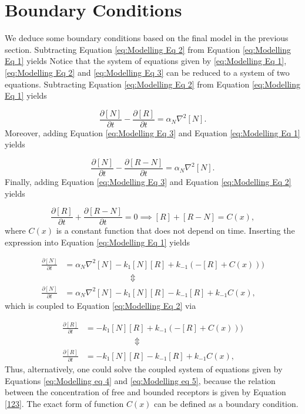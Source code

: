 \documentclass{article}
\begin{document}
\section{Boundary Conditions}
We deduce some boundary conditions based on the final model in the previous section. Subtracting Equation \eqref{eq:Modelling Eq 2} from Equation \eqref{eq:Modelling Eq 1} yields
Notice that the system of equations given by \eqref{eq:Modelling Eq 1}, \eqref{eq:Modelling Eq 2} and \eqref{eq:Modelling Eq 3} can be reduced to a system of two equations. Subtracting Equation \eqref{eq:Modelling Eq 2} from Equation \eqref{eq:Modelling Eq 1} yields

\begin{equation}\label{eqn:addition1}
    \frac{\partial [N]}{\partial t}-\frac{\partial [R]}{\partial t} = \alpha_N\nabla^2[N].
\end{equation}
Moreover, adding Equation \eqref{eq:Modelling Eq 3} and Equation \eqref{eq:Modelling Eq 1} yields

\begin{equation}\label{eqn:addition2}
    \frac{\partial [N]}{\partial t}-\frac{\partial [R-N]}{\partial t} = \alpha_N\nabla^2[N].
\end{equation}
Finally, adding Equation \eqref{eq:Modelling Eq 3} and Equation \eqref{eq:Modelling Eq 2} yields 

\begin{equation}\label{123}
    \frac{\partial [R]}{\partial t}+\frac{\partial [R-N]}{\partial t} = 0 \implies [R] + [R-N] = C(x),  
\end{equation}
where $C(x)$ is a constant function that does not depend on time. Inserting the expression into Equation \eqref{eq:Modelling Eq 1} yields 

\begin{align}
    \frac{\partial [N]}{\partial t} &= \alpha_N\nabla^2[N]- k_1[N][R] + k_{-1}(-[R]+C(x)))\nonumber\\
    &\qquad \qquad \qquad \qquad \Updownarrow \nonumber\\
    \frac{\partial [N]}{\partial t} &= \alpha_N\nabla^2[N]- k_1[N][R] - k_{-1}[R] + k_{-1}C(x) \label{eq:Modelling eq 4},
\end{align}
which is coupled to Equation \eqref{eq:Modelling Eq 2} via 

\begin{align}
    \frac{\partial [R]}{\partial t} &= - k_1[N][R] + k_{-1}(-[R]+C(x)))\nonumber\\
    &\qquad \qquad \qquad \Updownarrow \nonumber\\
    \frac{\partial [R]}{\partial t} &= - k_1[N][R] - k_{-1}[R] + k_{-1}C(x) \label{eq:Modelling eq 5},
\end{align}
Thus, alternatively, one could solve the coupled system of equations given by Equations \eqref{eq:Modelling eq 4} and \eqref{eq:Modelling eq 5}, because the relation between the concentration of free and bounded receptors is given by Equation \eqref{123}. The exact form of function $C(x)$ can be defined as a boundary condition. 
\end{document}
